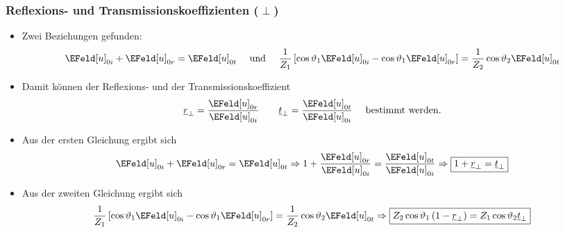 \begin{frame}
  \frametitle{Reflexions- und Transmissionskoeffizienten (\(\perp\))}  
\begin{itemize}[<+->]
\item Zwei Beziehungen gefunden:
  \begin{equation*}
    \EFeld[u]_{0i} + \EFeld[u]_{0r}= \EFeld[u]_{0t} \quad\text{ und }\quad \frac{1}{Z_1}\left[   \cos\vartheta_1\EFeld[u]_{0i}  -\cos\vartheta_1 \EFeld[u]_{0r} \right] = \frac{1}{Z_2} \cos\vartheta_2 \EFeld[u]_{0t}
  \end{equation*}
\item Damit können der \alert{Reflexions-} und der \alert{Transmissionskoeffizient}
  \begin{equation*}
    \underline{r}_\perp = \frac{\EFeld[u]_{0r}}{\EFeld[u]_{0i}} \qquad \underline{t}_\perp = \frac{\EFeld[u]_{0t}}{\EFeld[u]_{0i}} \quad\text{ bestimmt werden.} 
  \end{equation*}
\item Aus der ersten Gleichung ergibt sich
  \begin{equation*}
    \EFeld[u]_{0i} + \EFeld[u]_{0r}= \EFeld[u]_{0t} \Rightarrow  1+ \frac{\EFeld[u]_{0r}}{\EFeld[u]_{0i}}= \frac{\EFeld[u]_{0t}}{\EFeld[u]_{0i}} \Rightarrow \boxed{1+\underline{r}_\perp = \underline{t}_\perp}
\end{equation*}
\item Aus der zweiten Gleichung ergibt sich
  \begin{equation*}
    \frac{1}{Z_1}\left[   \cos\vartheta_1\EFeld[u]_{0i}  -\cos\vartheta_1 \EFeld[u]_{0r} \right] = \frac{1}{Z_2} \cos\vartheta_2 \EFeld[u]_{0t} \Rightarrow  \boxed{Z_2\cos\vartheta_1\left(1-\underline{r}_\perp\right) = Z_1 \cos\vartheta_2\underline{t}_\perp}
\end{equation*}
  \end{itemize}
\end{frame}

